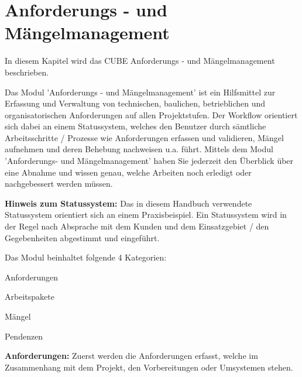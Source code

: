 
\clearpage

\section{Anforderungs - und Mängelmanagement}
\label{bkm:Ref2018071701}

In diesem Kapitel wird das CUBE Anforderungs - und Mängelmanagement beschrieben.

\vspace{\baselineskip}

Das Modul 'Anforderungs - und Mängelmanagement' ist ein Hilfsmittel zur Erfassung und Verwaltung von technischen, baulichen, betrieblichen und organisatorischen Anforderungen auf allen Projektstufen. Der Workflow orientiert sich dabei an einem Statussystem, welches den Benutzer durch sämtliche Arbeitsschritte / Prozesse wie Anforderungen erfassen und validieren, Mängel aufnehmen und deren Behebung nachweisen u.a. führt. Mittels dem Modul 'Anforderungs- und Mängelmanagement' haben Sie jederzeit den Überblick über eine Abnahme und wissen genau, welche Arbeiten noch erledigt oder nachgebessert werden müssen.

\vspace{\baselineskip}

\textbf{Hinweis zum Statussystem:} Das in diesem Handbuch verwendete Statussystem orientiert sich an einem Praxisbeispiel. Ein Statussystem wird in der Regel nach Absprache mit dem Kunden und dem Einsatzgebiet / den Gegebenheiten abgestimmt und eingeführt.

\vspace{\baselineskip}

Das Modul beinhaltet folgende 4 Kategorien:

\vspace{\baselineskip}

\begin{compactitem}
	\item Anforderungen
	\item Arbeitspakete
	\item Mängel
	\item Pendenzen
\end{compactitem}

\vspace{\baselineskip}

\textbf{Anforderungen:} Zuerst werden die Anforderungen erfasst, welche im Zusammenhang mit dem Projekt, den Vorbereitungen oder Umsystemen stehen. \\

